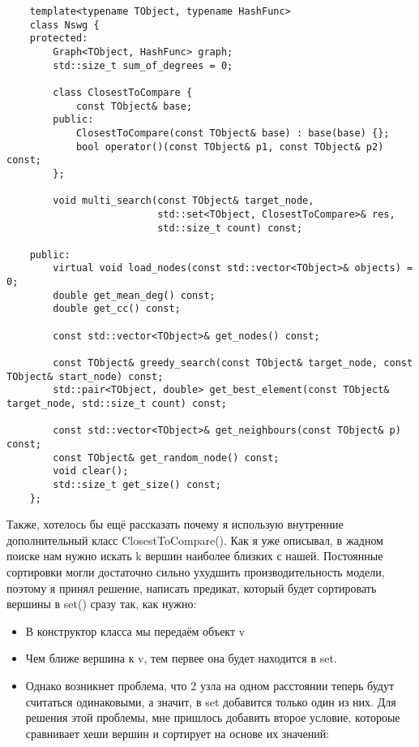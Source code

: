 \begin{verbatim}
    template<typename TObject, typename HashFunc>
    class Nswg {
    protected:
        Graph<TObject, HashFunc> graph;
        std::size_t sum_of_degrees = 0;

        class ClosestToCompare {
            const TObject& base;
        public:
            ClosestToCompare(const TObject& base) : base(base) {};
            bool operator()(const TObject& p1, const TObject& p2) const;
        };

        void multi_search(const TObject& target_node, 
                          std::set<TObject, ClosestToCompare>& res, 
                          std::size_t count) const;

    public:
        virtual void load_nodes(const std::vector<TObject>& objects) = 0;
        double get_mean_deg() const;
        double get_cc() const;

        const std::vector<TObject>& get_nodes() const;

        const TObject& greedy_search(const TObject& target_node, const TObject& start_node) const;
        std::pair<TObject, double> get_best_element(const TObject& target_node, std::size_t count) const;

        const std::vector<TObject>& get_neighbours(const TObject& p) const;
        const TObject& get_random_node() const;
        void clear();
        std::size_t get_size() const;
    };
\end{verbatim}

Также, хотелось бы ещё рассказать почему я использую внутренние дополнительный класс ClosestToCompare(). 
Как я уже описывал, в жадном поиске нам нужно искать k вершин наиболее близких с нашей.
Постоянные сортировки могли достаточно сильно ухудшить производительность модели, поэтому я принял решение, 
написать предикат, который будет сортировать вершины в set() сразу так, как нужно:
\begin{itemize}
    \item В конструктор класса мы передаём объект v
    \item Чем ближе вершина к v, тем первее она будет находится в set.
    \item Однако возникнет проблема, что 2 узла на одном расстоянии теперь будут считаться
    одинаковыми, а значит, в set добавится только один из них. Для решения этой проблемы, мне пришлось
    добавить второе условие, котороые сравнивает хеши вершин и сортирует на основе их значений:
\end{itemize}

